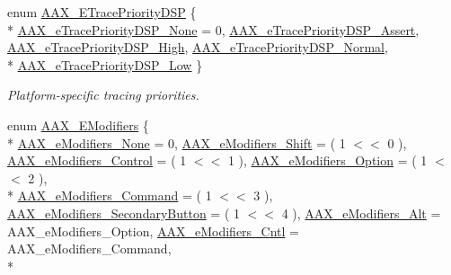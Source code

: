 \begin{DoxyCompactItemize}
enum \hyperlink{a00206_ac564db2d51bc55990fb37ab02062346c}{A\+A\+X\+\_\+\+E\+Trace\+Priority\+D\+S\+P} \{ \\*
\hyperlink{a00206_ac564db2d51bc55990fb37ab02062346cab2cbc9fe3f6a13ab38147e91891f4730}{A\+A\+X\+\_\+e\+Trace\+Priority\+D\+S\+P\+\_\+\+None} = 0, 
\hyperlink{a00206_ac564db2d51bc55990fb37ab02062346cad8f31b7a3f5eaf7cf4769feff5df2823}{A\+A\+X\+\_\+e\+Trace\+Priority\+D\+S\+P\+\_\+\+Assert}, 
\hyperlink{a00206_ac564db2d51bc55990fb37ab02062346ca7c834b78f90ee9407e8a57bcde1368ff}{A\+A\+X\+\_\+e\+Trace\+Priority\+D\+S\+P\+\_\+\+High}, 
\hyperlink{a00206_ac564db2d51bc55990fb37ab02062346ca78eefd1898fd00ccd2bc8fce0ebae9f3}{A\+A\+X\+\_\+e\+Trace\+Priority\+D\+S\+P\+\_\+\+Normal}, 
\\*
\hyperlink{a00206_ac564db2d51bc55990fb37ab02062346ca85b70ffea49989da83e400690baeb87f}{A\+A\+X\+\_\+e\+Trace\+Priority\+D\+S\+P\+\_\+\+Low}
 \}
\begin{DoxyCompactList}\small\item\em Platform-\/specific tracing priorities. \end{DoxyCompactList}\item 
enum \hyperlink{a00206_a47756e0a56d00468b7045eb26500cb78}{A\+A\+X\+\_\+\+E\+Modifiers} \{ \\*
\hyperlink{a00206_a47756e0a56d00468b7045eb26500cb78a1d315d9b8db08fb75a288885f0401d9f}{A\+A\+X\+\_\+e\+Modifiers\+\_\+\+None} = 0, 
\hyperlink{a00206_a47756e0a56d00468b7045eb26500cb78a17191c564e053ebd35d85ddcaf618e7e}{A\+A\+X\+\_\+e\+Modifiers\+\_\+\+Shift} = ( 1 $<$$<$ 0 ), 
\hyperlink{a00206_a47756e0a56d00468b7045eb26500cb78a72b3d9c056c8a3f80006a758c6452049}{A\+A\+X\+\_\+e\+Modifiers\+\_\+\+Control} = ( 1 $<$$<$ 1 ), 
\hyperlink{a00206_a47756e0a56d00468b7045eb26500cb78aeb1f15dba1fbaff6c1785f2f0d5b75bb}{A\+A\+X\+\_\+e\+Modifiers\+\_\+\+Option} = ( 1 $<$$<$ 2 ), 
\\*
\hyperlink{a00206_a47756e0a56d00468b7045eb26500cb78ab83037484467371ebfc4fd8dfa9b98a5}{A\+A\+X\+\_\+e\+Modifiers\+\_\+\+Command} = ( 1 $<$$<$ 3 ), 
\hyperlink{a00206_a47756e0a56d00468b7045eb26500cb78a6d7914ad68992fa2670fc0327704cbb7}{A\+A\+X\+\_\+e\+Modifiers\+\_\+\+Secondary\+Button} = ( 1 $<$$<$ 4 ), 
\hyperlink{a00206_a47756e0a56d00468b7045eb26500cb78a9c3906caab0d85bc03e0646a31e93553}{A\+A\+X\+\_\+e\+Modifiers\+\_\+\+Alt} = A\+A\+X\+\_\+e\+Modifiers\+\_\+\+Option, 
\hyperlink{a00206_a47756e0a56d00468b7045eb26500cb78a1ab287fa76cee2aca991f9afcffe53d6}{A\+A\+X\+\_\+e\+Modifiers\+\_\+\+Cntl} = A\+A\+X\+\_\+e\+Modifiers\+\_\+\+Command, 
\\*
$$
\end{DoxyCompactItemize}
